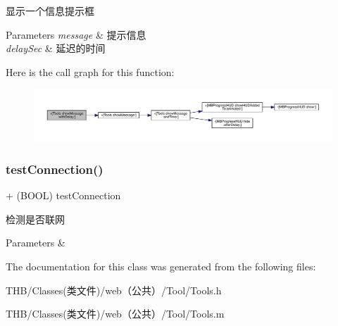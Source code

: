 显示一个信息提示框


\begin{DoxyParams}{Parameters}
{\em message} & 提示信息 \\
\hline
{\em delay\+Sec} & 延迟的时间 \\
\hline
\end{DoxyParams}
Here is the call graph for this function\+:\nopagebreak
\begin{figure}[H]
\begin{center}
\leavevmode
\includegraphics[width=350pt]{interface_tools_ab9fcfbb218e3e4e5299c292827944070_cgraph}
\end{center}
\end{figure}
\mbox{\label{interface_tools_a3a7c4c8f069ac8ead6d0acae85ca40b8}} 
\subsubsection{\texorpdfstring{test\+Connection()}{testConnection()}}
{\footnotesize\ttfamily + (B\+O\+OL) test\+Connection \begin{DoxyParamCaption}{ }\end{DoxyParamCaption}}

检测是否联网


\begin{DoxyParams}{Parameters}
{\em } & \\
\hline
\end{DoxyParams}


The documentation for this class was generated from the following files\+:\begin{DoxyCompactItemize}
\item 
T\+H\+B/\+Classes(类文件)/web（公共）/\+Tool/Tools.\+h\item 
T\+H\+B/\+Classes(类文件)/web（公共）/\+Tool/Tools.\+m\end{DoxyCompactItemize}
